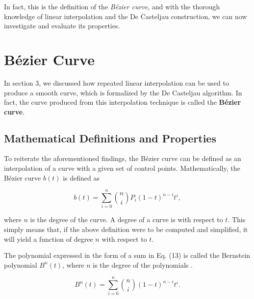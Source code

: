 \documentclass[12pt, oneside]{article}   	%
\numberwithin{figure}{section}
\begin{document}
In fact, this is the definition of the \emph{B\'{e}zier curve}, and with the thorough knowledge of linear interpolation and the De Casteljau construction, we can now investigate and evaluate its properties.

%

\section{B\'ezier Curve}

In section 3, we discussed how repeated linear interpolation can be used to produce a smooth curve, which is formalized by the De Casteljau algorithm. In fact, the curve produced from this interpolation technique is called the \textbf{B\'{e}zier curve}. 

\subsection{Mathematical Definitions and Properties}

To reiterate the aforementioned findings, the B\'{e}zier curve can be defined as an interpolation of a curve with a given set of control points. Mathematically, the B\'{e}zier curve \(b(t)\) is defined as

\begin{equation}
b(t) = \displaystyle\sum_{i=0}^{n}\binom{n}{i}P_i(1-t)^{n-i}t^i,
\end{equation}

where \(n\) is the degree of the curve. A degree of a curve is with respect to \(t\). This simply means that, if the above definition were to be computed and simplified, it will yield a function of degree \(n\) with respect to \(t\).

The polynomial expressed in the form of a sum in Eq. (13) is called the Bernstein polynomial \(B^{n}(t)\), where \(n\) is the degree of the polynomials \cite{PRAUTZ:2013}.

\begin{equation}
B^{n}(t) = \displaystyle\sum_{i=0}^{n} \binom{n}{i}(1-t)^{n-i}t^i.
\end{equation}
\end{document}
